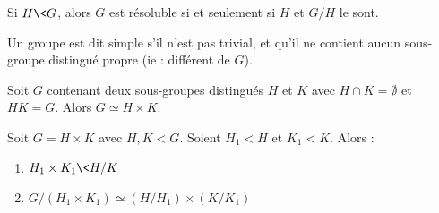 \begin{theo}

Si $H\<G$, alors $G$ est résoluble si et seulement si $H$ et $G/H$ le sont.
\end{theo}


\begin{defi}
 
Un groupe est dit simple s'il n'est pas trivial, et qu'il ne contient aucun
sous-groupe distingué propre (ie : différent de $G$).
\end{defi}


\begin{theo}
 
Soit $G$ contenant deux sous-groupes distingués $H$ et $K$ avec $H\cap K =
\emptyset$ et $HK = G$. Alors $G \simeq H\times K$.
\end{theo}


\begin{theo}

 Soit $G = H\times K$ avec $H,K < G$. Soient $H_1 < H$ et $K_1 < K$. Alors :
\begin{enumerate}
 \item $H_1\times K_1 \< H/K$
 \item $G / (H_1 \times K_1) \simeq (H/H_1) \times (K/K_1)$
\end{enumerate}
\end{theo}

